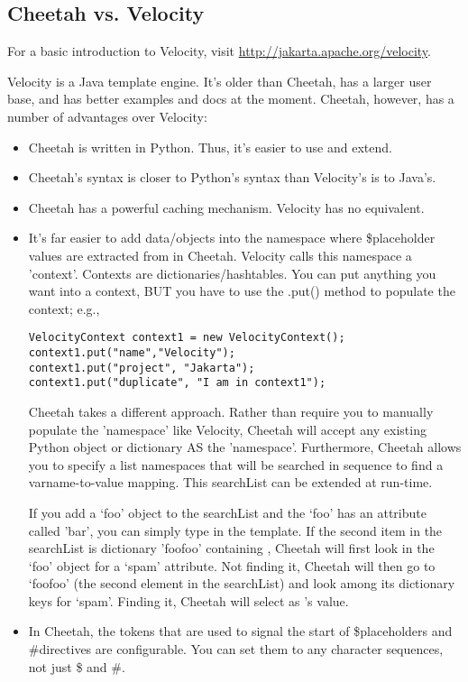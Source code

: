 \subsection{Cheetah vs. Velocity}
\label{comparisons.velocity}

For a basic introduction to Velocity, visit
\url{http://jakarta.apache.org/velocity}.

Velocity is a Java template engine.  It's older than Cheetah, has a larger user
base, and has better examples and docs at the moment. Cheetah, however, has a
number of advantages over Velocity:
\begin{itemize}
\item Cheetah is written in Python. Thus, it's easier to use and extend.
\item Cheetah's syntax is closer to Python's syntax than Velocity's is to
Java's.
\item Cheetah has a powerful caching mechanism.  Velocity has no equivalent.
\item It's far easier to add data/objects into the namespace where \$placeholder
     values are extracted from in Cheetah.  Velocity calls this namespace a 'context'.
     Contexts are dictionaries/hashtables. You can put anything you want into a
     context, BUT you have to use the .put() method to populate the context; 
     e.g.,

\begin{verbatim}
VelocityContext context1 = new VelocityContext();
context1.put("name","Velocity");
context1.put("project", "Jakarta");
context1.put("duplicate", "I am in context1");
\end{verbatim}
     
     Cheetah takes a different approach. Rather than require you to manually
     populate the 'namespace' like Velocity, Cheetah will accept any existing
     Python object or dictionary AS the 'namespace'.  Furthermore, Cheetah
     allows you to specify a list namespaces that will be searched in sequence
     to find a varname-to-value mapping.  This searchList can be extended at
     run-time.
     
    If you add a `foo' object to the searchList and the `foo' has an attribute
    called 'bar', you can simply type  in the template.  If the
    second item in the searchList is dictionary 'foofoo' containing
    , Cheetah will first look in the `foo'
    object for a `spam' attribute.  Not finding it, Cheetah will then go to
    `foofoo' (the second element in the searchList) and look among its
    dictionary keys for `spam'.  Finding it, Cheetah will select
     as 's value.

\item In Cheetah, the tokens that are used to signal the start of
     \$placeholders and \#directives are configurable. You can set them to any
     character sequences, not just \$ and \#.
\end{itemize}


